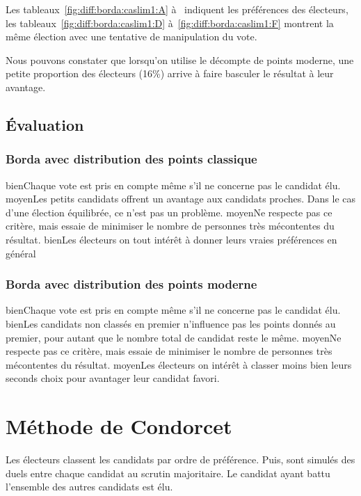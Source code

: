 \documentclass[../report]{subfiles}
\begin{document}
  Les tableaux~\ref{fig:diff:borda:caslim1:A} à~ indiquent les 
  préférences des électeurs, les tableaux~\ref{fig:diff:borda:caslim1:D} 
  à~\ref{fig:diff:borda:caslim1:F} montrent la même élection avec une tentative de manipulation 
  du vote.

  Nous pouvons constater que lorsqu'on utilise le décompte de points moderne, une petite 
  proportion des électeurs (16\%) arrive à faire basculer le résultat à leur avantage.


  \subsection{Évaluation}
  \subsubsection{Borda avec distribution des points classique}
  \tabcritere%
    {bien}{Chaque vote est pris en compte même s'il ne concerne pas le candidat élu.}%
    {moyen}{Les petits candidats offrent un avantage aux candidats proches. Dans le cas d'une élection équilibrée, ce n'est pas un problème.}%
    {moyen}{Ne respecte pas ce critère, mais essaie de minimiser le nombre de personnes très mécontentes du résultat.}%
    {bien}{Les électeurs on tout intérêt à donner leurs vraies préférences en général}
  \subsubsection{Borda avec distribution des points moderne}
  \tabcritere%
    {bien}{Chaque vote est pris en compte même s'il ne concerne pas le candidat élu.}%
    {bien}{Les candidats non classés en premier n'influence pas les points donnés au premier, pour autant que le nombre total de candidat reste le même.}%
    {moyen}{Ne respecte pas ce critère, mais essaie de minimiser le nombre de personnes très mécontentes du résultat.}%
    {moyen}{Les électeurs on intérêt à classer moins bien leurs seconds choix pour avantager leur candidat favori.}


  \section{Méthode de Condorcet}

  Les électeurs classent les candidats par ordre de préférence. 
  Puis, sont simulés des duels entre chaque candidat au scrutin majoritaire.
  Le candidat ayant battu l'ensemble des autres candidats est élu.
\end{document}
